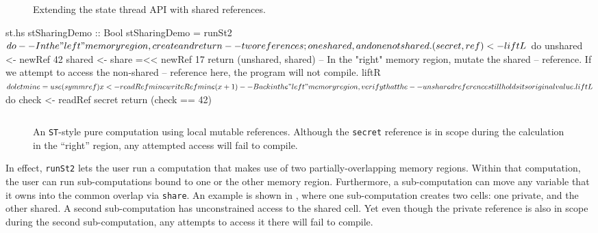 \documentclass[format=sigplan, review=false, screen=true, 10pt]{acmart}
\makeatletter
\let\origsection\section
\renewcommand\section{\@ifstar{\starsection}{\nostarsection}}
\newcommand\nostarsection[1]
{\sectionprelude\origsection{#1}\sectionpostlude}
\newcommand\starsection[1]
{\sectionprelude\origsection*{#1}\sectionpostlude}
\newcommand\sectionprelude{%
  \vspace{-0.5em}
}
\newcommand\sectionpostlude{%
  \vspace{0em}
}
\makeatother
\begin{document}
\begin{figure}
  \inputminted{haskell}{st2.hs}
  \caption{Extending the state thread API with shared references.\label{st-sharing-api}}
\end{figure}

\begin{filecontents*}{st.hs}
stSharingDemo :: Bool
stSharingDemo = runSt2 $ do
  -- In the "left" memory region, create and return
  -- two references; one shared, and one not shared.
  (secret, ref) <- liftL $ do
      unshared <- newRef 42
      shared   <- share =<< newRef 17
      return (unshared, shared)
  -- In the "right" memory region, mutate the shared
  -- reference. If we attempt to access the non-shared
  -- reference here, the program will not compile.
  liftR $ do
      let mine = use (symm ref)
      x <- readRef mine
      writeRef mine (x + 1)
  -- Back in the "left" memory region, verify that the
  -- unshared reference still holds its original value.
  liftL $ do
      check <- readRef secret
      return (check == 42)
\end{filecontents*}

\begin{figure}
  \inputminted{haskell}{st.hs}
  \caption{An \texttt{ST}-style pure computation using local mutable
    references. 
    Although the \texttt{secret} reference is in scope during the calculation
    in the ``right'' region, any attempted access will fail to compile.\label{st-example}}
\end{figure}

In effect, \texttt{runSt2} lets the user run a computation that makes use of
two partially-overlapping memory regions. Within that computation, the user
can run sub-computations bound to one or the other memory region. Furthermore,
a sub-computation can move any variable that it owns into the common overlap
via \texttt{share}. An example is shown in , where one sub-computation
creates two cells: one private, and the other shared. A second sub-computation has unconstrained
access to the shared cell. Yet even though the private reference is also in scope during
the second sub-computation, any attempts to access it there will fail to compile.

\section{Case Study \#3: Key-value lookups}
\end{document}
